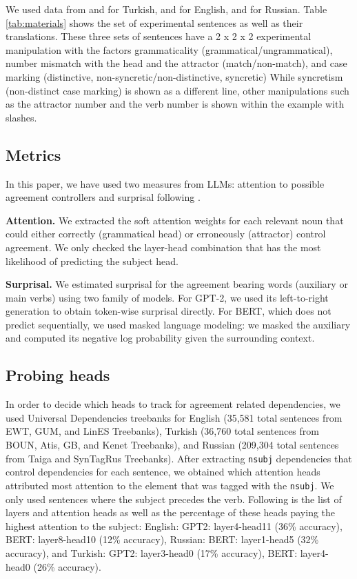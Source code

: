 \documentclass[10pt,letterpaper]{article}
\begin{document}
We used data from  and  for Turkish,  and  for English, and  for Russian. Table \ref{tab:materials} shows the set of experimental sentences as well as their translations. These three sets of sentences have a 2 x 2 x 2 experimental manipulation with the factors grammaticality (grammatical/ungrammatical), number mismatch with the head and the attractor (match/non-match), and case marking (distinctive, non-syncretic/non-distinctive, syncretic) While syncretism (non-distinct case marking) is shown as a different line, other manipulations such as the attractor number and the verb number is shown within the example with slashes. 

\subsection{Metrics}

In this paper, we have used two measures from LLMs: attention to possible agreement controllers and surprisal following \cite{RyuLewis2021}. 

\textbf{Attention.} We extracted the soft attention weights for each relevant noun that could either correctly (grammatical head) or erroneously (attractor) control agreement. We only checked the layer-head combination that has the most likelihood of predicting the subject head. 

\textbf{Surprisal.} We estimated surprisal for the agreement bearing words (auxiliary or main verbs) using two family of models. For GPT-2, we used its left-to-right generation to obtain token-wise surprisal directly. For BERT, which does not predict sequentially, we used masked language modeling: we masked the auxiliary and computed its negative log probability given the surrounding context.


\subsection{Probing heads}

In order to decide which heads to track for agreement related dependencies, we used Universal Dependencies treebanks for English (35,581 total sentences from EWT, GUM, and LinES Treebanks), Turkish (36,760 total sentences from BOUN, Atis, GB, and Kenet Treebanks), and Russian (209,304 total sentences from Taiga and SynTagRus Treebanks). After extracting \texttt{nsubj} dependencies that control dependencies for each sentence, we obtained which attention heads attributed most attention to the element that was tagged with the \texttt{nsubj}. We only used sentences where the subject precedes the verb. Following is the list of layers and attention heads as well as the percentage of these heads paying the highest attention to the subject: English: GPT2: layer4-head11 (36\% accuracy), BERT: layer8-head10 (12\% accuracy), Russian: BERT: layer1-head5 (32\% accuracy), and Turkish: GPT2: layer3-head0 (17\% accuracy), BERT: layer4-head0 (26\% accuracy).
\end{document}
